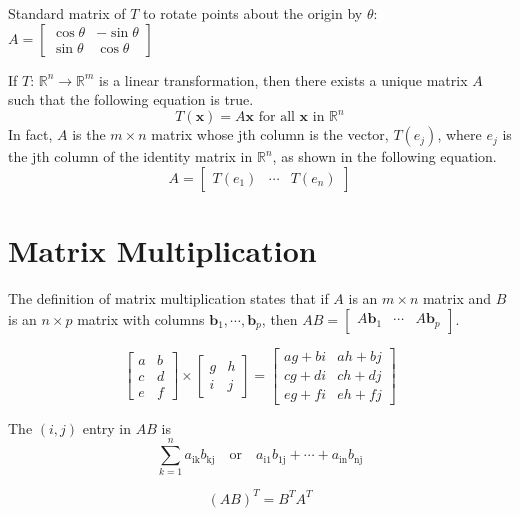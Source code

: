 \documentclass{article}
\begin{document}
Standard matrix of $T$ to rotate points about the origin by $\theta$:
$A=\begin{bmatrix}
    \cos\theta & -\sin\theta \\
    \sin\theta & \cos\theta
\end{bmatrix}$

If $T$: $\mathbb{R}^n\rightarrow\mathbb{R}^m$ is a linear transformation, then there exists a
unique matrix $A$ such that the following equation is true.
\[T(\mathbf{x})=A\mathbf{x}\text{ for all }\mathbf{x}\text{ in }\mathbb{R}^n\]
In fact, $A$ is the $m\times n$ matrix whose jth column is the vector, $T(e_j)$, where $e_j$ is the
jth column of the identity matrix in $\mathbb{R}^n$, as shown in the following equation.
\[A=\begin{bmatrix}
    T(e_1) & \cdots & T(e_n) 
\end{bmatrix}\]

\section*{Matrix Multiplication}
The definition of matrix multiplication states that if $A$ is an $m\times n$ matrix and $B$ is an
$n\times p$ matrix with columns $\mathbf{b}_1, \cdots , \mathbf{b}_p$, then
$AB=\begin{bmatrix} A\mathbf{b}_1 & \cdots & A\mathbf{b}_p \end{bmatrix}$.

\[
\begin{bmatrix}
    a & b \\
    c & d \\
    e & f
\end{bmatrix}
\times
\begin{bmatrix}
    g & h \\
    i & j
\end{bmatrix}
=
\begin{bmatrix}
    ag+bi & ah+bj \\
    cg+di & ch+dj \\
    eg+fi & eh+fj
\end{bmatrix}
\]

The $(i, j)$ entry in $AB$ is
\[\sum_{k=1}^n a_{\text{ik}}b_{\text{kj}}\quad \text{or} \quad a_{\text{i1}}b_{\text{1j}}+\cdots +
a_{\text{in}}b_{\text{nj}}\]

\[{(AB)}^T=B^T A^T\]
\end{document}
